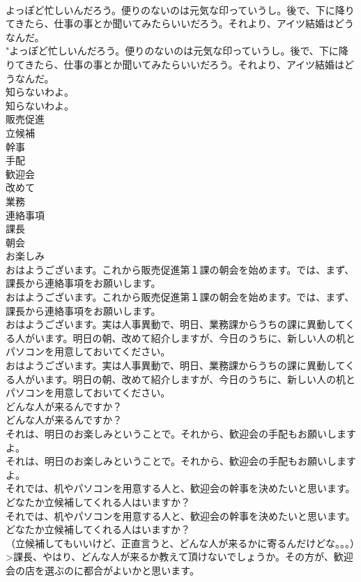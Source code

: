\documentclass[8pt]{extreport}
\begin{document}
\begin{CJK}{UTF8}{min}
\\	よっぽど忙しいんだろう。便りのないのは元気な印っていうし。後で、下に降りてきたら、仕事の事とか聞いてみたらいいだろう。それより、アイツ結婚はどうなんだ。	
\\	"よっぽど忙しいんだろう。便りのないのは元気な印っていうし。後で、下に降りてきたら、仕事の事とか聞いてみたらいいだろう。それより、アイツ結婚はどうなんだ。 
\\	知らないわよ。	
\\	知らないわよ。 
\\	販売促進
\\	立候補
\\	幹事
\\	手配
\\	歓迎会
\\	改めて
\\	業務
\\	連絡事項
\\	課長
\\	朝会
\\	お楽しみ
\\	おはようございます。これから販売促進第１課の朝会を始めます。では、まず、課長から連絡事項をお願いします。	
\\	おはようございます。これから販売促進第１課の朝会を始めます。では、まず、課長から連絡事項をお願いします。 
\\	おはようございます。実は人事異動で、明日、業務課からうちの課に異動してくる人がいます。明日の朝、改めて紹介しますが、今日のうちに、新しい人の机とパソコンを用意しておいてください。	
\\	おはようございます。実は人事異動で、明日、業務課からうちの課に異動してくる人がいます。明日の朝、改めて紹介しますが、今日のうちに、新しい人の机とパソコンを用意しておいてください。 
\\	どんな人が来るんですか？	
\\	どんな人が来るんですか？ 
\\	それは、明日のお楽しみということで。それから、歓迎会の手配もお願いしますよ。	
\\	それは、明日のお楽しみということで。それから、歓迎会の手配もお願いしますよ。 
\\	それでは、机やパソコンを用意する人と、歓迎会の幹事を決めたいと思います。どなたか立候補してくれる人はいますか？	
\\	それでは、机やパソコンを用意する人と、歓迎会の幹事を決めたいと思います。どなたか立候補してくれる人はいますか？ 
\\	（立候補してもいいけど、正直言うと、どんな人が来るかに寄るんだけどな。。。）>課長、やはり、どんな人が来るか教えて頂けないでしょうか。その方が、歓迎会の店を選ぶのに都合がよいかと思います。	

\end{CJK}
\end{document}
